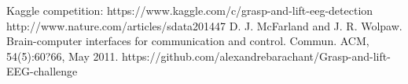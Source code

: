 \documentclass[final,leqno,onefignum,onetabnum]{siamltexmm}
\begin{document}

\begin{thebibliography}{1}
 Kaggle competition:  https://www.kaggle.com/c/grasp-and-lift-eeg-detection
 http://www.nature.com/articles/sdata201447
D. J. McFarland and J. R. Wolpaw. Brain-computer interfaces for communication and control.
Commun. ACM, 54(5):60?66, May 2011.
https://github.com/alexandrebarachant/Grasp-and-lift-EEG-challenge

\end{thebibliography} 
\end{document}
